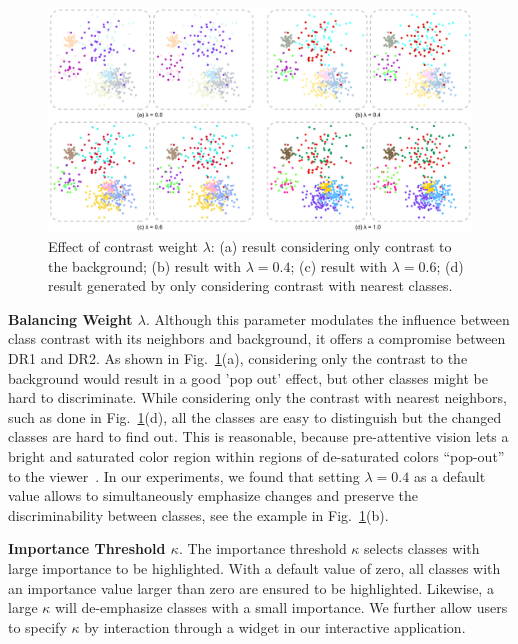 \begin{figure}[!htb]
\centering
\includegraphics[width=1.0\textwidth]{figures/lambda.pdf}
\caption{Effect of contrast weight $\lambda$: (a) result  considering only contrast to the background; (b) result with $\lambda=0.4$; (c) result with $\lambda=0.6$; (d) result generated by only considering contrast with nearest classes. }
\vspace*{-3mm}
\label{fig:lambda}
\end{figure}

\noindent\textbf{Balancing Weight $\lambda$}.
Although this parameter modulates the influence between class contrast with its neighbors and  background, it offers a compromise between DR1 and DR2.
As shown in Fig.~\ref{fig:lambda}(a), considering only the contrast to the background would result in a good 'pop out' effect, but other classes might be hard to discriminate. While considering only the contrast with nearest neighbors, such as done in Fig.~\ref{fig:lambda}(d), all the classes are easy to distinguish but the changed classes are hard to find out.
This is reasonable, because pre-attentive vision
lets a bright and saturated color region within regions of de-saturated colors ``pop-out'' to the viewer~\cite{healey1995visualizing}.
In our experiments, we found that setting  $\lambda=0.4$ as a default value allows to simultaneously emphasize changes and preserve the discriminability between classes, see the  example in Fig.~\ref{fig:lambda}(b).

\vspace{1.5mm}
\noindent\textbf{Importance Threshold $\kappa$}.
The importance threshold $\kappa$ selects classes with large importance to be highlighted.
With a default value of zero, all classes with an importance value larger than zero are ensured to be highlighted. Likewise, a large $\kappa$ will de-emphasize classes with a small importance.
We further allow users to specify $\kappa$ by interaction through a widget in our interactive application. %


